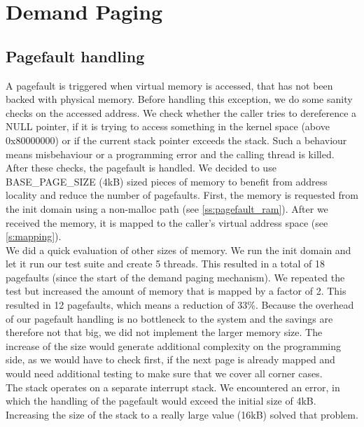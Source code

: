 \section{Demand Paging}\label{s:paging}
\subsection{Pagefault handling}
A pagefault is triggered when virtual memory is accessed, that has not been backed with physical memory. Before handling this exception, we do some sanity checks on the accessed address. We check whether the caller tries to dereference a NULL pointer, if it is trying to access something in the kernel space (above 0x80000000) or if the current stack pointer exceeds the stack. Such a behaviour means misbehaviour or a programming error and the calling thread is killed.\\
After these checks, the pagefault is handled. We decided to use BASE\_PAGE\_SIZE (4kB) sized pieces of memory to benefit from address locality and reduce the number of pagefaults. First, the memory is requested from the init domain using a non-malloc path (see \ref{ss:pagefault_ram}). After we received the memory, it is mapped to the caller's virtual address space (see \ref{s:mapping}).\\
We did a quick evaluation of other sizes of memory. We run the init domain and let it run our test suite and create 5 threads. This resulted in a total of 18 pagefaults (since the start of the demand paging mechanism). We repeated the test but increased the amount of memory that is mapped by a factor of 2. This resulted in 12 pagefaults, which means a reduction of 33\%. Because the overhead of our pagefault handling is no bottleneck to the system and the savings are therefore not that big, we did not implement the larger memory size. The increase of the size would generate additional complexity on the programming side, as we would have to check first, if the next page is already mapped and would need additional testing to make sure that we cover all corner cases.\\
The stack operates on a separate interrupt stack. We encountered an error, in which the handling of the pagefault would exceed the initial size of 4kB. Increasing the size of the stack to a really large value (16kB) solved that problem.

